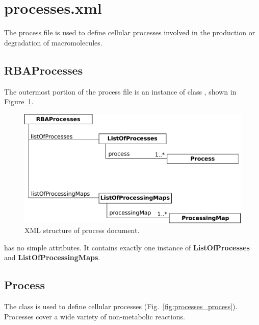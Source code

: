 
\section{processes.xml}

The process file is used to define cellular processes involved in
the production or degradation of macromolecules.

\subsection{RBAProcesses}
\label{sec:rba_processes}

The outermost portion of the process file is an instance of class
\rbaprocesses, shown in Figure~\ref{fig:processes_doc}.

\begin{figure}
  \centering
  \includegraphics[scale=0.8]{figures/processes_doc}
  \caption{XML structure of process document.}
\label{fig:processes_doc}
\end{figure}

\rbamacromolecules{} has no simple attributes.
It contains exactly one instance of \textbf{ListOfProcesses}
and \textbf{ListOfProcessingMaps}.


\subsection{Process}
\label{sec:process}

The \process{} class is used to define cellular processes
(Fig.~\ref{fig:processes_process}).
Processes cover a wide variety of non-metabolic reactions.

